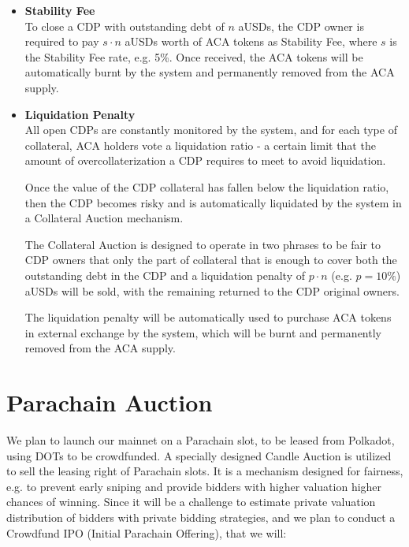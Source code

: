 \documentclass{article}
\begin{document}
\begin{itemize}
    \item \textbf{Stability Fee} \\
    To close a CDP with outstanding debt of $n$ aUSDs, the CDP owner is required to pay $s \cdot n$ aUSDs worth of ACA tokens as Stability Fee, where $s$ is the Stability Fee rate, e.g. 5\%. Once received, the ACA tokens will be automatically burnt by the system and permanently removed from the ACA supply.  
    
    \item \textbf{Liquidation Penalty} \\
    All open CDPs are constantly monitored by the system, and for each type of collateral, ACA holders vote a liquidation ratio - a certain limit that the amount of overcollaterization a CDP requires to meet to avoid liquidation.  
    
    Once the value of the CDP collateral has fallen below the liquidation ratio, then the CDP becomes risky and is automatically liquidated by the system in a Collateral Auction mechanism. 

    The Collateral Auction is designed to operate in two phrases to be fair to CDP owners that only the part of collateral that is enough to cover both the outstanding debt in the CDP and a liquidation penalty of $p \cdot n$ (e.g. $p=10\%$) aUSDs will be sold, with the remaining returned to the CDP original owners. 
    
    The liquidation penalty will be automatically used to purchase ACA tokens in external exchange by the system, which will be burnt and permanently removed from the ACA supply.  
     
\end{itemize}

\section{Parachain Auction}
We plan to launch our mainnet on a Parachain slot, to be leased from Polkadot, using DOTs to be crowdfunded. A specially designed Candle Auction is utilized to sell the leasing right of Parachain slots. It is a mechanism designed for fairness, e.g. to prevent early sniping and provide bidders with higher valuation higher chances of winning. Since it will be a challenge to estimate private valuation distribution of bidders with private bidding strategies, and we plan to conduct a Crowdfund IPO (Initial Parachain Offering), that we will:
\end{document}
